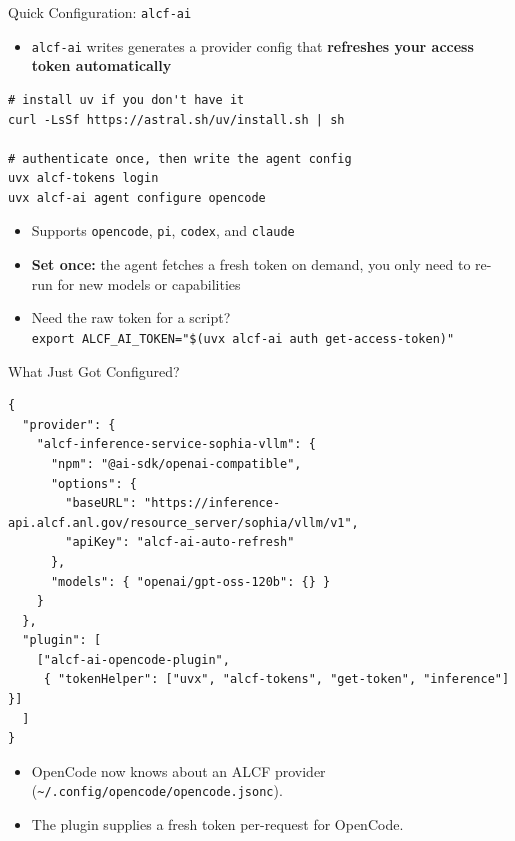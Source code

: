 \documentclass[10pt,aspectratio=169]{beamer}
\begin{document}
\begin{frame}[fragile]{Quick Configuration: \texttt{alcf-ai}}
  \begin{itemize}
    \item \texttt{alcf-ai} writes generates a provider config that
      \textbf{refreshes your access token automatically}
  \end{itemize}
  \begin{verbatim}
# install uv if you don't have it
curl -LsSf https://astral.sh/uv/install.sh | sh

# authenticate once, then write the agent config
uvx alcf-tokens login
uvx alcf-ai agent configure opencode
  \end{verbatim}
  \pause
  \begin{itemize}
    \item Supports \texttt{opencode}, \texttt{pi}, \texttt{codex}, and
      \texttt{claude}
      \pause
    \item \textbf{Set once:} the agent fetches a fresh token on demand, you
      only need to re-run for new models or capabilities
      \pause
    \item Need the raw token for a script? \\
      \texttt{export ALCF\_AI\_TOKEN="\$(uvx alcf-ai auth get-access-token)"}
  \end{itemize}
\end{frame}

\begin{frame}[fragile]{What Just Got Configured?}
  \begin{verbatim}
{
  "provider": {
    "alcf-inference-service-sophia-vllm": {
      "npm": "@ai-sdk/openai-compatible",
      "options": {
        "baseURL": "https://inference-api.alcf.anl.gov/resource_server/sophia/vllm/v1",
        "apiKey": "alcf-ai-auto-refresh"
      },
      "models": { "openai/gpt-oss-120b": {} }
    }
  },
  "plugin": [
    ["alcf-ai-opencode-plugin",
     { "tokenHelper": ["uvx", "alcf-tokens", "get-token", "inference"] }]
  ]
}
  \end{verbatim}
  \begin{itemize}
    \item OpenCode now knows about an ALCF provider
      (\texttt{\textasciitilde/.config/opencode/opencode.jsonc}).
      \pause
    \item The plugin supplies a fresh token per-request for OpenCode.
  \end{itemize}
\end{frame}
\end{document}
